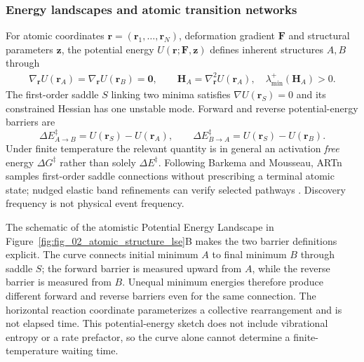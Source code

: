 \documentclass[11pt,a4paper]{article}
\begin{document}
\subsubsection{Energy landscapes and atomic transition networks}
For atomic coordinates $\mathbf r=(\mathbf r_1,\ldots,\mathbf r_N)$, deformation gradient $\mathbf F$ and structural parameters $\mathbf z$, the potential energy $U(\mathbf r;\mathbf F,\mathbf z)$ defines inherent structures $A,B$ through
\begin{align}
 \nabla_{\mathbf r} U(\mathbf r_A)=\nabla_{\mathbf r}U(\mathbf r_B)=\mathbf 0,\qquad
 \mathbf H_A=\nabla^2_{\mathbf r}U(\mathbf r_A),\quad\lambda_{\min}^{+}(\mathbf H_A)>0.\label{eq:inherent}
\end{align}
The first-order saddle $S$ linking two minima satisfies $\nabla U(\mathbf r_S)=0$ and its constrained Hessian has one unstable mode. Forward and reverse potential-energy barriers are
\begin{equation}
\Delta E^{\ddagger}_{A\to B}=U(\mathbf r_S)-U(\mathbf r_A),\qquad
\Delta E^{\ddagger}_{B\to A}=U(\mathbf r_S)-U(\mathbf r_B).\label{eq:barriers}
\end{equation}
Under finite temperature the relevant quantity is in general an activation \emph{free} energy $\Delta G^\ddagger$ rather than solely $\Delta E^\ddagger$. Following Barkema and Mousseau, ARTn samples first-order saddle connections without prescribing a terminal atomic state; nudged elastic band refinements can verify selected pathways \cite{barkema1996,mousseau1998,mousseau2012}. Discovery frequency is not physical event frequency.

The schematic of the atomistic Potential Energy Landscape in Figure~\ref{fig:fig_02_atomic_structure_lse}B makes the two barrier definitions explicit. The curve connects initial minimum $A$ to final minimum $B$ through saddle $S$; the forward barrier is measured upward from $A$, while the reverse barrier is measured from $B$. Unequal minimum energies therefore produce different forward and reverse barriers even for the same connection. The horizontal reaction coordinate parameterizes a collective rearrangement and is not elapsed time. This potential-energy sketch does not include vibrational entropy or a rate prefactor, so the curve alone cannot determine a finite-temperature waiting time.
\end{document}
